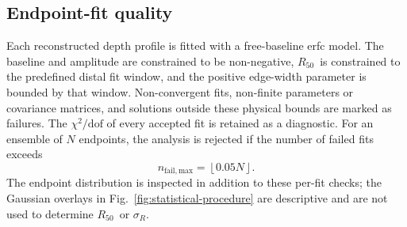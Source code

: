 \documentclass[11pt]{article}
\newcommand{\Rc}{\ensuremath{R_{50}}}
\begin{document}
\subsection{Endpoint-fit quality}

Each reconstructed depth profile is fitted with a free-baseline erfc model.
The baseline and amplitude are constrained to be non-negative, \Rc\ is
constrained to the predefined distal fit window, and the positive edge-width
parameter is bounded by that window. Non-convergent fits, non-finite parameters
or covariance matrices, and solutions outside these physical bounds are marked
as failures. The $\chi^2/\mathrm{dof}$ of every accepted fit is retained as a
diagnostic. For an ensemble of $N$ endpoints, the analysis is rejected if the
number of failed fits exceeds
%
\begin{equation}
  n_{\mathrm{fail,max}}=\left\lfloor0.05N\right\rfloor .
  \label{eq:fit-failure-limit}
\end{equation}
%
The endpoint distribution is inspected in addition to these per-fit checks;
the Gaussian overlays in Fig.~\ref{fig:statistical-procedure} are descriptive
and are not used to determine \Rc\ or $\sigma_R$.



\end{document}

